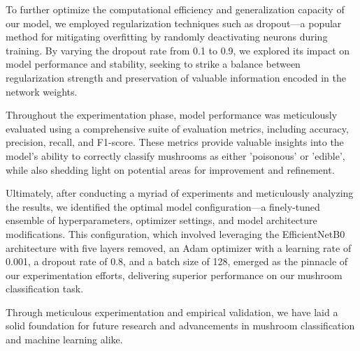 To further optimize the computational efficiency and generalization capacity of our model, we employed regularization techniques such as dropout—a popular method for mitigating overfitting by randomly deactivating neurons during training. By varying the dropout rate from 0.1 to 0.9, we explored its impact on model performance and stability, seeking to strike a balance between regularization strength and preservation of valuable information encoded in the network weights.

Throughout the experimentation phase, model performance was meticulously evaluated using a comprehensive suite of evaluation metrics, including accuracy, precision, recall, and F1-score. These metrics provide valuable insights into the model's ability to correctly classify mushrooms as either 'poisonous' or 'edible', while also shedding light on potential areas for improvement and refinement.

Ultimately, after conducting a myriad of experiments and meticulously analyzing the results, we identified the optimal model configuration—a finely-tuned ensemble of hyperparameters, optimizer settings, and model architecture modifications. This configuration, which involved leveraging the EfficientNetB0 architecture with five layers removed, an Adam optimizer with a learning rate of 0.001, a dropout rate of 0.8, and a batch size of 128, emerged as the pinnacle of our experimentation efforts, delivering superior performance on our mushroom classification task.

Through meticulous experimentation and empirical validation, we have laid a solid foundation for future research and advancements in mushroom classification and machine learning alike.